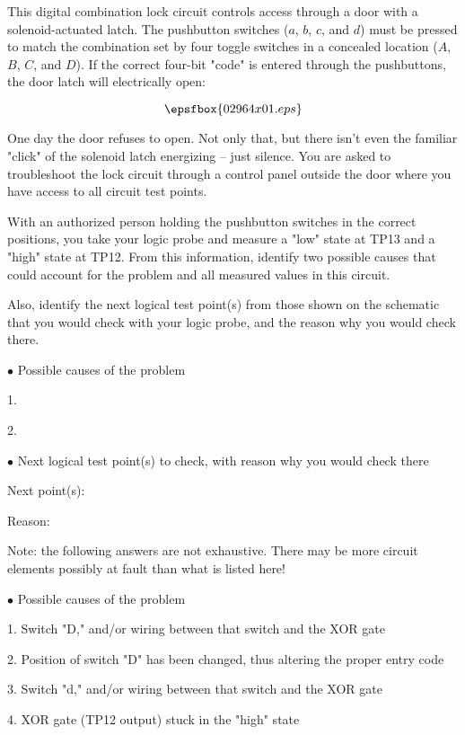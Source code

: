 

This digital combination lock circuit controls access through a door with a solenoid-actuated latch.  The pushbutton switches ($a$, $b$, $c$, and $d$) must be pressed to match the combination set by four toggle switches in a concealed location ($A$, $B$, $C$, and $D$).  If the correct four-bit "code" is entered through the pushbuttons, the door latch will electrically open:

$$\epsfbox{02964x01.eps}$$

One day the door refuses to open.  Not only that, but there isn't even the familiar "click" of the solenoid latch energizing -- just silence.  You are asked to troubleshoot the lock circuit through a control panel outside the door where you have access to all circuit test points.

With an authorized person holding the pushbutton switches in the correct positions, you take your logic probe and measure a "low" state at TP13 and a "high" state at TP12.  From this information, identify two possible causes that could account for the problem and all measured values in this circuit.

Also, identify the next logical test point(s) from those shown on the schematic that you would check with your logic probe, and the reason why you would check there.

\medskip
\item{$\bullet$} Possible causes of the problem
\item{1.}
\item{2.} 
\medskip

\medskip
\item{$\bullet$} Next logical test point(s) to check, with reason why you would check there
\item{Next point(s):}
\item{Reason:}
\medskip







Note: the following answers are not exhaustive.  There may be more circuit elements possibly at fault than what is listed here!

\medskip
\goodbreak
\item{$\bullet$} Possible causes of the problem
\item{1.} Switch "D," and/or wiring between that switch and the XOR gate
\item{2.} Position of switch "D" has been changed, thus altering the proper entry code
\item{3.} Switch "d," and/or wiring between that switch and the XOR gate
\item{4.} XOR gate (TP12 output) stuck in the "high" state
\medskip

